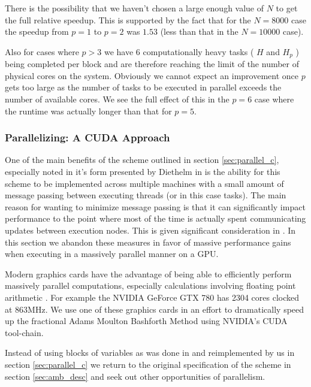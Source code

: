 There is the possibility that we haven't chosen a large enough value of $ N $ to get the full relative speedup. This is supported by the fact that for the $ N = 8000 $ case the speedup from $ p = 1 $ to $ p = 2 $ was $ 1.53 $ (less than that in the $ N = 10000 $ case). 

Also for cases where $ p > 3 $ we have 6 computationally heavy tasks ( $ H $ and $ H_p $ ) being completed per block and are therefore reaching the limit of the number of physical cores on the system. Obviously we cannot expect an improvement once $ p $ gets too large as the number of tasks to be executed in parallel exceeds the number of available cores. We see the full effect of this in the $ p = 6 $ case where the runtime was actually longer than that for $ p = 5 $.

\subsubsection{Parallelizing: A CUDA Approach}

\label{sec:parallel_cuda}

One of the main benefits of the scheme outlined in section \ref{sec:parallel_c}, especially noted in it's form presented by Diethelm in \cite{Diethelm2011} is the ability for this scheme to be implemented across multiple machines with a small amount of message passing between executing threads (or in this case tasks). The main reason for wanting to minimize message passing is that it can significantly impact performance to the point where most of the time is actually spent communicating updates between execution nodes. This is given significant consideration in \cite{Diethelm2011}. In this section we abandon these measures in favor of massive performance gains when executing in a massively parallel manner on a GPU.

Modern graphics cards have the advantage of being able to efficiently perform massively parallel computations, especially calculations involving floating point arithmetic \cite{Fernando2005}. For example the NVIDIA GeForce GTX 780 has 2304 cores clocked at 863MHz. We use one of these graphics cards in an effort to dramatically speed up the fractional Adams Moulton Bashforth Method using NVIDIA's CUDA tool-chain.

Instead of using blocks of variables as was done in \cite{Diethelm2011} and reimplemented by us in section \ref{sec:parallel_c} we return to the original specification of the scheme in section \ref{sec:amb_desc} and seek out other opportunities of parallelism.

